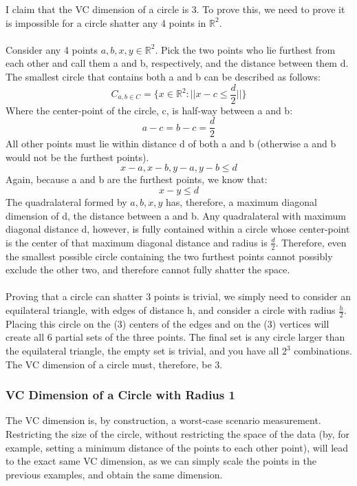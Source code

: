 \documentclass[a4paper,12pt]{article}
\begin{document}
I claim that the VC dimension of a circle is 3. To prove this, we need to prove it is impossible for a circle shatter any 4 points in $\mathbb{R}^2$. \\
\\
Consider any 4 points ${a,b,x,y} \in \mathbb{R}^2$. Pick the two points who lie furthest from each other and call them a and b, respectively, and the distance between them d. The smallest circle that contains both a and b can be described as follows:
$$
C_{a,b \in C} = \big\{ x \in \mathbb{R}^2 : || x - c \leq \frac{d}{2}|| \big\}
$$
Where the center-point of the circle, c, is half-way between a and b:
$$
a - c = b - c = \frac{d}{2}
$$
All other points must lie within distance d of both a and b (otherwise a and b would not be the furthest points).
$$
x - a, x - b, y - a, y - b \leq d
$$
Again, because a and b are the furthest points, we know that:
$$
x - y \leq d
$$
The quadralateral formed by ${a,b,x,y}$ has, therefore, a maximum diagonal dimension of d, the distance between a and b. Any quadralateral with maximum diagonal distance d, however, is fully contained within a circle whose center-point is the center of that maximum diagonal distance and radius is $\frac{d}{2}$. Therefore, even the smallest possible circle containing the two furthest points cannot possibly exclude the other two, and therefore cannot fully shatter the space. \\
\\
Proving that a circle can shatter 3 points is trivial, we simply need to consider an equilateral triangle, with edges of distance h, and consider a circle with radius $\frac{h}{2}$. Placing this circle on the (3) centers of the edges and on the (3) vertices will create all 6 partial sets of the three points. The final set is any circle larger than the equilateral triangle, the empty set is trivial, and you have all $2^3$ combinations. The VC dimension of a circle must, therefore, be 3.

\subsubsection*{VC Dimension of a Circle with Radius 1}
The VC dimension is, by construction, a worst-case scenario measurement. Restricting the size of the circle, without restricting the space of the data (by, for example, setting a minimum distance of the points to each other point), will lead to the exact same VC dimension, as we can simply scale the points in the previous examples, and obtain the same dimension.
\end{document}
